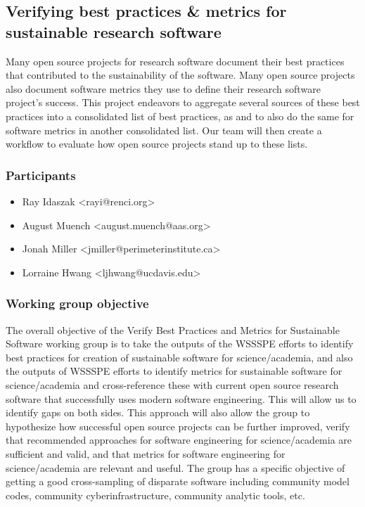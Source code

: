 \subsection{Verifying best practices \& metrics for sustainable research software}
\label{sec:best-practices-sustainable}


Many open source projects for research software document their best practices that contributed to the sustainability of the software.  Many open source projects also document software metrics they use to define their research software project’s success.  This project endeavors to aggregate several sources of these best practices into a consolidated list of best practices, as and to also do the same for software metrics in another consolidated list.  Our team will then create a workflow to evaluate how open source projects stand up to these lists.

\subsubsection{Participants}

\begin{itemize}
\item Ray Idaszak <rayi@renci.org>
\item August Muench <august.muench@aas.org>
\item Jonah Miller <jmiller@perimeterinstitute.ca>
\item Lorraine Hwang <ljhwang@ucdavis.edu>
\end{itemize}

\subsubsection{Working group objective}

The overall objective of the Verify Best Practices and Metrics for Sustainable Software working group is to take the outputs of the WSSSPE efforts to identify best practices for creation of sustainable software for science/academia, and also the outputs of WSSSPE efforts to identify metrics for sustainable software for science/academia and cross-reference these with current open source research software that successfully uses modern software engineering.  This will allow us to identify gaps on both sides.  This approach will also allow the group to  hypothesize how successful open source projects can be further improved, verify that recommended approaches for software engineering for science/academia are sufficient and valid, and that metrics for software engineering for science/academia are relevant and useful.  The group has a specific objective of getting a good cross-sampling of disparate software including community model codes, community cyberinfrastructure, community analytic tools, etc.

